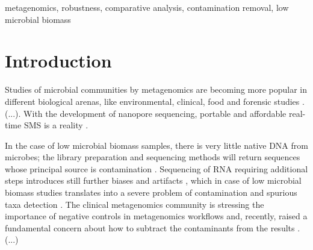 \documentclass{GR}
\begin{document}
{ 

\begin{keywords}
	metagenomics, robustness, comparative analysis, contamination removal, low microbial biomass
\end{keywords}




\section*{Introduction}

Studies of microbial communities by metagenomics are becoming more popular in different biological arenas, like environmental, clinical, food and forensic studies \parencite{publicHealth, food, forensicsBook}. (...). With the development of nanopore sequencing, portable and affordable real-time SMS is a reality \parencite{extreme}.

In the case of low microbial biomass samples, there is very little native DNA from microbes; the library preparation and sequencing methods will return sequences whose principal source is contamination \parencite{Weiss2014Knight, pitfalls}. Sequencing of RNA requiring additional steps introduces still further biases and artifacts \parencite{centrifuge}, which in case of low microbial biomass studies translates into a severe problem of contamination and spurious taxa detection \parencite{metaCSF}. The clinical metagenomics community is stressing the importance of negative controls in metagenomics workflows and, recently, raised a fundamental concern about how to subtract the contaminants from the results \parencite{Ruppe2018}. (...)

}
\end{document}
